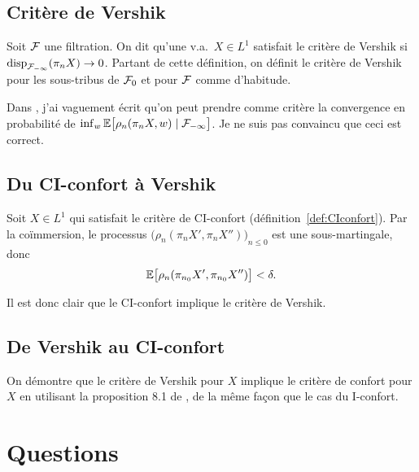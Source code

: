 \documentclass[12pt,a4paper]{article}
\begin{document}
\subsection{Critère de Vershik}

\begin{definition}
Soit $\mathcal{F}$ une filtration. On dit qu'une v.a.\ $X \in L^1$ 
satisfait le critère de Vershik si $\textrm{disp}_{\mathcal{F}_{-\infty}}(\pi_nX) \to 0$.
Partant de cette définition, on 
 définit le critère de Vershik pour les sous-tribus de $\mathcal{F}_0$ et pour $\mathcal{F}$ 
comme d'habitude. 
\end{definition}

Dans \cite{LauXLV}, j'ai vaguement écrit qu'on peut prendre 
comme critère la convergence en probabilité de 
$\inf_w\mathbb{E}\bigl[\rho_n(\pi_nX, w) \mid \mathcal{F}_{-\infty}\bigr]$. 
Je ne suis pas convaincu que ceci est correct. 

\subsection{Du CI-confort à Vershik}

Soit $X \in L^1$ qui satisfait le critère de CI-confort (définition~\ref{def:CIconfort}). 
Par la co\"immersion, le processus ${\bigl(\rho_n(\pi_n X', \pi_n X'')\bigr)}_{n \leq 0}$ 
est une sous-martingale, donc 
$$
\mathbb{E}\bigl[ \rho_n(\pi_{n_0} X', \pi_{n_0} X'') \bigr] < \delta. 
$$

Il est donc clair que le CI-confort implique le critère de Vershik. 


\subsection{De Vershik au CI-confort}

On démontre que le critère de Vershik pour $X$ implique le critère de confort 
pour $X$ en utilisant la proposition 8.1 de \cite{LauTeoriya}, de 
la même façon que le cas du I-confort. 

\section{Questions}
\end{document}

